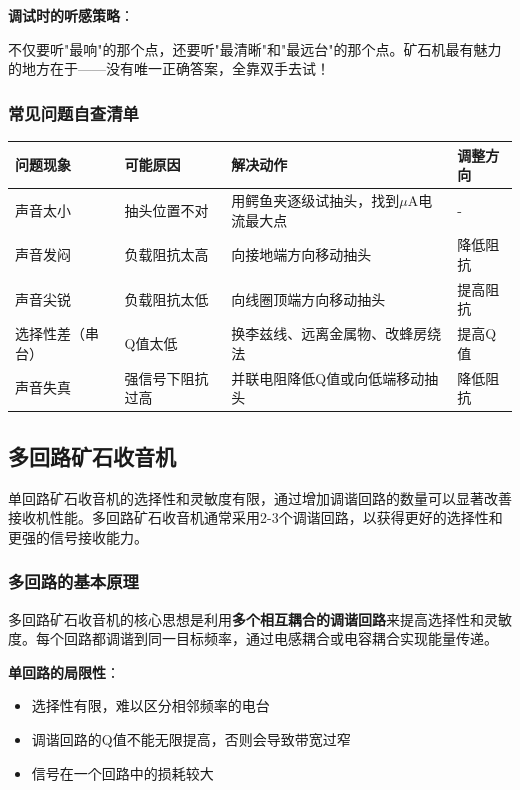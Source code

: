 \textbf{调试时的听感策略}：

不仅要听"最响"的那个点，还要听"最清晰"和"最远台"的那个点。矿石机最有魅力的地方在于——没有唯一正确答案，全靠双手去试！

\subsubsection{常见问题自查清单}
\label{sec:impedance_troubleshooting}

\begin{center}
\begin{tabular}{|p{2.5cm}|p{3cm}|p{3cm}|p{3cm}|}
\hline
\textbf{问题现象} & \textbf{可能原因} & \textbf{解决动作} & \textbf{调整方向} \\
\hline
声音太小 & 抽头位置不对 & 用鳄鱼夹逐级试抽头，找到$\mu$A电流最大点 & - \\
声音发闷 & 负载阻抗太高 & 向接地端方向移动抽头 & 降低阻抗 \\
声音尖锐 & 负载阻抗太低 & 向线圈顶端方向移动抽头 & 提高阻抗 \\
选择性差（串台） & Q值太低 & 换李兹线、远离金属物、改蜂房绕法 & 提高Q值 \\
声音失真 & 强信号下阻抗过高 & 并联电阻降低Q值或向低端移动抽头 & 降低阻抗 \\
\hline
\end{tabular}
\end{center}

\subsection{多回路矿石收音机}
\label{sec:multi_loop_crystal_radio}

单回路矿石收音机的选择性和灵敏度有限，通过增加调谐回路的数量可以显著改善接收机性能。多回路矿石收音机通常采用2-3个调谐回路，以获得更好的选择性和更强的信号接收能力。

\subsubsection{多回路的基本原理}
\label{sec:multi_loop_principle}

多回路矿石收音机的核心思想是利用\textbf{多个相互耦合的调谐回路}来提高选择性和灵敏度。每个回路都调谐到同一目标频率，通过电感耦合或电容耦合实现能量传递。

\textbf{单回路的局限性}：
\begin{itemize}
    \item 选择性有限，难以区分相邻频率的电台
    \item 调谐回路的Q值不能无限提高，否则会导致带宽过窄
    \item 信号在一个回路中的损耗较大
\end{itemize}

